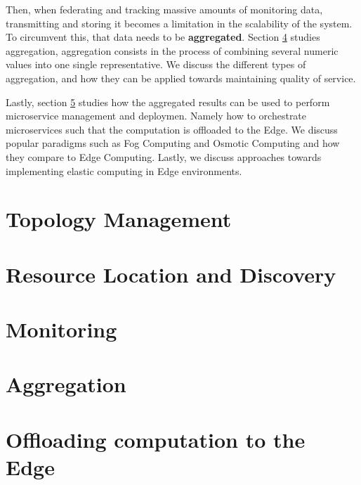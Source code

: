Then, when federating and tracking massive amounts of monitoring data, transmitting and storing it becomes a limitation in the scalability of the system. To circumvent this, that data needs to be \textbf{aggregated}. Section \ref{sec:aggregation} studies aggregation, aggregation consists in the process of combining several numeric values into one single representative. We discuss the different types of aggregation, and how they can be applied towards maintaining quality of service.

Lastly, section \ref{sec:offloading_computation} studies how the aggregated results can be used to perform microservice management and deploymen. Namely how to orchestrate microservices such that the computation is offloaded to the Edge. We discuss popular paradigms such as Fog Computing and Osmotic Computing and how they compare to Edge Computing. Lastly, we discuss approaches towards implementing elastic computing in Edge environments.

\section{Topology Management} \label{sec:topology_management} 

\section{Resource Location and Discovery} \label{sec:res_location} 

\section{Monitoring} \label{sec:res_monitoring} 

\section{Aggregation} \label{sec:aggregation} 

\section{Offloading computation to the Edge} \label{sec:offloading_computation} 

